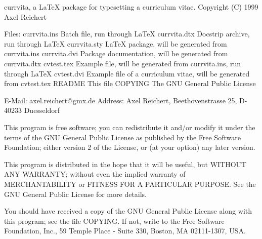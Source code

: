 currvita, a LaTeX package for typesetting a curriculum vitae.
    Copyright (C) 1999  Axel Reichert

    Files:
    currvita.ins   Batch file, run through LaTeX
    currvita.dtx   Docstrip archive, run through LaTeX
    currvita.sty   LaTeX package, will be generated from currvita.ins
    currvita.dvi   Package documentation, will be generated from
                   currvita.dtx
    cvtest.tex     Example file, will be generated from currvita.ins,
                   run through LaTeX
    cvtest.dvi     Example file of a curriculum vitae, will be
                   generated from cvtest.tex
    README         This file
    COPYING        The GNU General Public License

    E-Mail:    axel.reichert@gmx.de
    Address:   Axel Reichert, Beethovenstrasse 25, D-40233 Duesseldorf

    This program is free software; you can redistribute it and/or modify
    it under the terms of the GNU General Public License as published by
    the Free Software Foundation; either version 2 of the License, or
    (at your option) any later version.

    This program is distributed in the hope that it will be useful,
    but WITHOUT ANY WARRANTY; without even the implied warranty of
    MERCHANTABILITY or FITNESS FOR A PARTICULAR PURPOSE.  See the
    GNU General Public License for more details.

    You should have received a copy of the GNU General Public License
    along with this program; see the file COPYING.  If not, write to
    the Free Software Foundation, Inc., 59 Temple Place - Suite 330,
    Boston, MA 02111-1307, USA.